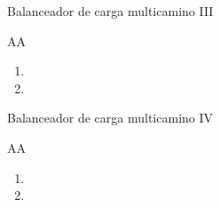 \documentclass[10pt,spanish,xcolor={svgnames}]{beamer}
\begin{document}
\begin{frame}{Balanceador de carga multicamino III}
\vspace*{-2em}
\begin{exampleblock}{AA}
\begin{enumerate}
\item
\vspace{1em}
\item\end{enumerate}
\end{exampleblock}
\note{\large \vfill
	\begin{center}
		\begin{enumerate}
			\item  
			\vspace{2em}	
			\item  
			\vspace{2em}
			\item  
			\vspace{2em}
			\vfill
		\end{enumerate}
\end{center}}
\end{frame}





\begin{frame}{Balanceador de carga multicamino IV}
\vspace*{-2em}
\begin{exampleblock}{AA}
\begin{enumerate}
\item
\vspace{1em}
\item
\end{enumerate}
\end{exampleblock}



\end{frame}
\end{document}
